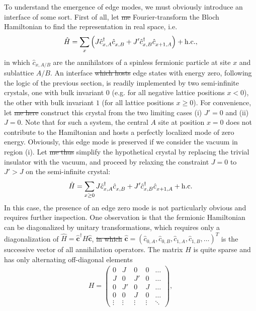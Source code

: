 \documentclass{svmono}
\def\hc{{\rm h.c.}}
\def\pdag{{\vphantom\dag}}
\newcommand{\brlr}[1]{\left( #1 \right)}
\providecommand{\DIFaddtex}[1]{{\protect\color{blue}\uwave{#1}}} %
\providecommand{\DIFdeltex}[1]{{\protect\color{red}\sout{#1}}}                      %
\providecommand{\DIFaddbegin}{} %
\providecommand{\DIFaddend}{} %
\providecommand{\DIFdelbegin}{} %
\providecommand{\DIFdelend}{} %
\providecommand{\DIFadd}[1]{\texorpdfstring{\DIFaddtex{#1}}{#1}} %
\providecommand{\DIFdel}[1]{\texorpdfstring{\DIFdeltex{#1}}{}} %
\newcommand{\DIFscaledelfig}{0.5}
\newlength{\DIFdelgraphicswidth} %
\newlength{\DIFdelgraphicsheight} %
\newcommand{\DIFaddincludegraphics}[2][]{{\color{blue}\fbox{\DIFOincludegraphics[#1]{#2}}}} %
\newcommand{\DIFdelincludegraphics}[2][]{%
\sbox{\DIFdelgraphicsbox}{\DIFOincludegraphics[#1]{#2}}%
\settoboxwidth{\DIFdelgraphicswidth}{\DIFdelgraphicsbox} %
\settoboxtotalheight{\DIFdelgraphicsheight}{\DIFdelgraphicsbox} %
\scalebox{\DIFscaledelfig}{%
\parbox[b]{\DIFdelgraphicswidth}{\usebox{\DIFdelgraphicsbox}\\[-\baselineskip] \rule{\DIFdelgraphicswidth}{0em}}\llap{\resizebox{\DIFdelgraphicswidth}{\DIFdelgraphicsheight}{%
\setlength{\unitlength}{\DIFdelgraphicswidth}%
\begin{picture}(1,1)%
\thicklines\linethickness{2pt} %
{\color[rgb]{1,0,0}\put(0,0){\framebox(1,1){}}}%
{\color[rgb]{1,0,0}\put(0,0){\line( 1,1){1}}}%
{\color[rgb]{1,0,0}\put(0,1){\line(1,-1){1}}}%
\end{picture}%
}\hspace*{3pt}}} %
} %
\DeclareRobustCommand{\DIFaddbegin}{\DIFOaddbegin \let\includegraphics\DIFaddincludegraphics} %
\DeclareRobustCommand{\DIFaddend}{\DIFOaddend \let\includegraphics\DIFOincludegraphics} %
\DeclareRobustCommand{\DIFdelbegin}{\DIFOdelbegin \let\includegraphics\DIFdelincludegraphics} %
\DeclareRobustCommand{\DIFdelend}{\DIFOaddend \let\includegraphics\DIFOincludegraphics} %
\begin{document}
To understand the emergence of edge modes, we must obviously introduce an interface of some sort.
First of all, let \DIFdelbegin \DIFdel{me }\DIFdelend \DIFaddbegin \DIFadd{us }\DIFaddend Fourier-transform the Bloch Hamiltonian to find the representation in real space, i.e.
\begin{align}
    \hat H = \sum_x \brlr{J\hat c^\dag_{x,A}\hat c^\pdag_{x,B} + J' \hat c^\dag_{x,B}\hat c^\pdag_{x+1,A}} + \hc,
\end{align}
in which $\hat c_{x,A/B}$ are the annihilators of a spinless fermionic particle at site $x$ and sublattice $A/B$.
An interface \DIFdelbegin \DIFdel{which hosts }\DIFdelend \DIFaddbegin \DIFadd{hosting }\DIFaddend edge states with energy zero, following the logic of the previous section, is readily implemented by two semi-infinite crystals, one with bulk invariant $0$ (e.g. for all negative lattice positions $x<0$), the other with bulk invariant $1$ (for all lattice positions $x\geq0$).
For convenience, let \DIFdelbegin \DIFdel{me here }\DIFdelend \DIFaddbegin \DIFadd{us }\DIFaddend construct this crystal from the two limiting cases (i) $J'=0$ and (ii) $J=0$.
Note that for such a system, the central $A$ site at position $x=0$ does not contribute to the Hamiltonian and hosts a perfectly localized mode of zero energy.
Obviously, this edge mode is preserved if we consider the vacuum in region (i).
Let \DIFdelbegin \DIFdel{me thus }\DIFdelend \DIFaddbegin \DIFadd{us }\DIFaddend simplify the hypothetical crystal by replacing the trivial insulator with the vacuum, and proceed by relaxing the constraint $J=0$ to $J'>J$ on the semi-infinite crystal:
\begin{align}
    \hat H = \sum_{x\geq0} J \hat c^\dag_{x,A}\hat c^\pdag_{x,B} + J' \hat c^\dag_{x,B}\hat c^\pdag_{x+1,A} + \hc
\end{align}
In this case, the presence of an edge zero mode is not particularly obvious and requires further inspection.
One observation is that the fermionic Hamiltonian can be diagonalized by unitary transformations, which requires only a diagonalization of $\hat H = \hat{\bm c}^\dag H \hat{\bm c}$, \DIFdelbegin \DIFdel{in which }\DIFdelend \DIFaddbegin \DIFadd{where }\DIFaddend $\hat{\bm c}=(\hat c_{0,A},\hat c_{0,B},\hat c_{1,A},\hat c_{1,B},\dots)^T$ is the successive vector of all \DIFaddbegin \DIFadd{fermionic }\DIFaddend annihilation operators.
The matrix $H$ is quite sparse and has only alternating off-diagonal elements
\begin{align}
    H =
    \begin{pmatrix}
        0 & J & 0 & 0 &\dots \\
        J & 0 & J' & 0 & \dots \\
        0 & J' & 0 & J & \dots \\
        0 & 0 & J & 0 & \dots \\
        \vdots & \vdots & \vdots & \vdots & \ddots
    \end{pmatrix},
\end{align}
\end{document}
